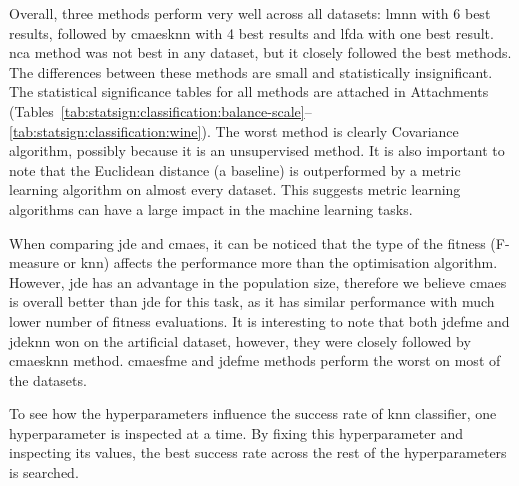 \documentclass[12pt,a4paper]{report}
\begin{document}
Overall, three methods perform very well across all datasets: \ac{lmnn} with 6 best results, followed by \ac{cmaesknn} with 4 best results and \ac{lfda} with one best result. \ac{nca} method was not best in any dataset, but it closely followed the best methods. The differences between these methods are small and statistically insignificant. The statistical significance tables for all methods are attached in Attachments (Tables~\ref{tab:statsign:classification:balance-scale}--\ref{tab:statsign:classification:wine}). The worst method is clearly Covariance algorithm, possibly because it is an unsupervised method. It is also important to note that the Euclidean distance (a baseline) is outperformed by a metric learning algorithm on almost every dataset. This suggests metric learning algorithms can have a large impact in the machine learning tasks.

When comparing \ac{jde} and \ac{cmaes}, it can be noticed that the type of the fitness (F-measure or \ac{knn}) affects the performance more than the optimisation algorithm. However, \ac{jde} has an advantage in the population size, therefore we believe \ac{cmaes} is overall better than \ac{jde} for this task, as it has similar performance with much lower number of fitness evaluations. It is interesting to note that both \ac{jdefme} and \ac{jdeknn} won on the artificial  dataset, however, they were closely followed by \ac{cmaesknn} method. \ac{cmaesfme} and \ac{jdefme} methods perform the worst on most of the datasets.



To see how the hyperparameters influence the success rate of \ac{knn} classifier, one hyperparameter is inspected at a time. By fixing this hyperparameter and inspecting its values, the best success rate across the rest of the hyperparameters is searched.
\end{document}
